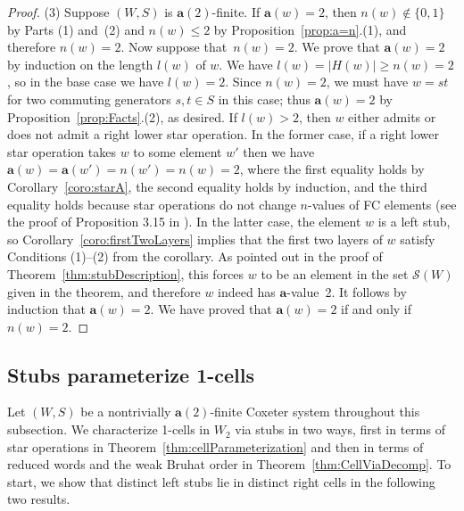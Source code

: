 \documentclass[ALCO,Unicode,published]{cedram}
\newcommand{\la}{\mathbf{a}}
\newcommand{\sw}{\mathcal{S}(W)}
\newcommand{\ntatf}{nontrivially $\la(2)$-finite }
\newcommand{\abs}[1]{\lvert #1 \rvert}
\begin{document}
\begin{remark}
\begin{proof}
(3) Suppose $(W,S)$ is $\la(2)$-finite. If $\la(w)=2$, then $n(w)\notin\{0,1\}$ by Parts (1) and~(2)
and $n(w)\le 2$ by Proposition~\ref{prop:a=n}.(1), and therefore $n(w)=2$. Now suppose that~$n(w)=2$. We prove that
$\la(w)=2$ by induction on the length $l(w)$ of $w$. We have $l(w)= \abs{H(w)}\ge n(w)=2$, so in the
base case we have $l(w)=2$. Since $n(w)=2$, we must have $w=st$ for two commuting generators $s,t\in
S$ in this case; thus $\la(w)=2$ by Proposition~\ref{prop:Facts}.(2), as desired.  If $l(w)>2$, then $w$
either admits or does not admit a right lower star operation. In the former case, if a right lower
star operation takes $w$ to some element $w'$ then we have $\la(w)=\la(w')=n(w')=n(w)=2$, where the
first equality holds by Corollary~\ref{coro:starA}, the second equality holds by induction, and the third
equality holds because star operations do not change $n$-values of FC elements (see the proof of
Proposition 3.15 in \cite{GreenXu}). In the latter case, the element $w$ is a left stub, so
Corollary~\ref{coro:firstTwoLayers} implies that the first two layers of $w$ satisfy Conditions (1)--(2) from
the corollary. As pointed out in the proof of Theorem~\ref{thm:stubDescription}, this forces $w$ to be an
element in the set $\sw$ given in the theorem, and therefore $w$ indeed has $\la$-value~2.  It
follows by induction that $\la(w)=2$. We have proved that $\la(w)=2$ if and only if~$n(w)=2$.
\end{proof}
    \end{remark}

\subsection{Stubs parameterize 1-cells}
\label{sec:1cells}
Let $(W,S)$ be a \ntatf Coxeter system throughout this subsection. We characterize 1-cells in $W_2$
via stubs in two ways, first in terms of star operations in Theorem~\ref{thm:cellParameterization} and then
in terms of reduced words and the weak Bruhat order in Theorem~\ref{thm:CellViaDecomp}. To start, we show
that distinct left stubs lie in distinct right cells in the following two results.
\end{document}
